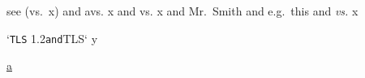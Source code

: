 see (vs.~x) and avs. x and vs. x and Mr.~Smith and e.g.~this and
\emph{vs.} x

`\texttt{TLS} 1.2\texttt{and}TLS` y

\href{http://x/a\%60b\%20c\%22d\%3Ce\%3Ef\%7Cg\%7Bh\%7Di\%5Ej\%5Bk\%5Dl\%n~o}{a}
